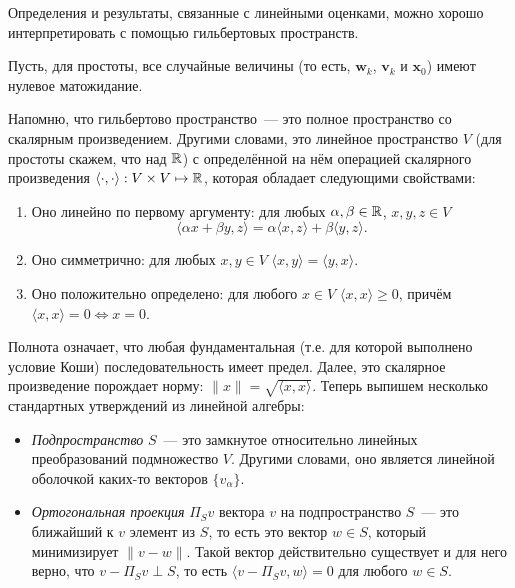 \begin{leftbar}
\begin{small}
	Определения и результаты, связанные с линейными оценками, можно хорошо 
	интерпретировать с помощью гильбертовых пространств. 
	
	Пусть, для простоты, все случайные величины (то есть, \(\mathbf{w}_{k}\), 
	\(\mathbf{v}_{k}\) и \(\mathbf{x}_{0}\)) имеют нулевое матожидание.
	
	Напомню, что гильбертово пространство~--- это полное пространство со 
	скалярным произведением. Другими словами, это линейное пространство 
	\(V\) (для простоты скажем, что над \(\mathbb{R}\)) с определённой на нём операцией 
	скалярного произведения \(\langle\cdot, \cdot\rangle : V \times V \mapsto 
	\mathbb{R}\), которая обладает следующими свойствами:
	\begin{enumerate}
		\item Оно линейно по первому аргументу: для любых \(\alpha, \beta 
		\in \mathbb{R}\), \(x, y, z \in V\)
		\[
			\langle \alpha x + \beta y, z\rangle = \alpha\langle x, z\rangle + 
			\beta\langle y, z\rangle.
		\]
		\item Оно симметрично: для любых \(x, y \in V\) \(\langle x, y\rangle 
		= \langle y, x\rangle\).
		
		\item Оно положительно определено: для любого \(x \in V\) \(\langle x, 
		x \rangle \geq 0\), причём \(\langle x, x \rangle = 0 \iff x = 0\).
	\end{enumerate}
	
	Полнота означает, что любая фундаментальная (т.е. для которой выполнено 
	условие Коши) последовательность имеет предел. Далее, это скалярное 
	произведение порождает норму: \(\|x\| = \sqrt{\langle x, x\rangle}\). 
	Теперь выпишем несколько стандартных утверждений из линейной алгебры:
	\begin{itemize}
		\item \emph{Подпространство} \(S\)~--- это замкнутое относительно 
		линейных преобразований подмножество \(V\). Другими словами, оно 
		является линейной оболочкой каких-то векторов \(\{v_{\alpha}\}\).
		
		\item \emph{Ортогональная проекция} \(\Pi_{S}v\) вектора \(v\) на 
		подпространство \(S\)~--- это ближайший к \(v\) элемент из \(S\), то 
		есть это вектор \(w \in S\), который минимизирует \(\|v - w\|\). Такой 
		вектор действительно существует и для него верно, что \(v - \Pi_{S}v 
		\perp S\), то есть \(\langle v - \Pi_{S}v, w\rangle = 0\) для любого 
		\(w \in S\).
		

\end{itemize}
\end{small}
\end{leftbar}
